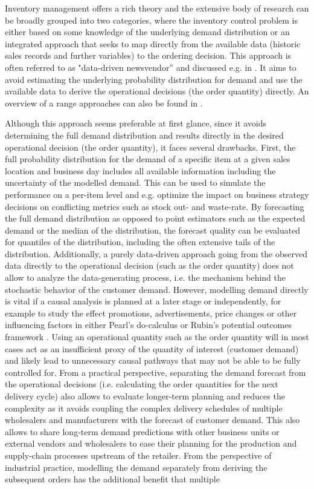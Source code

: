 \documentclass[BCOR=1mm, DIV=calc,10pt,
twoside=true,
twocolumn,
headings=normal]{scrartcl}
\begin{document}
Inventory management offers a rich theory and the extensive body of research can be broadly grouped into two categories, where the inventory control problem is either based on some knowledge of the underlying demand  distribution or an integrated approach that seeks to map directly from the available data (historic sales records and further variables) to the ordering decision. This approach is often referred to as "data-driven newsvendor'' and discussed  e.g. in \cite{beutel2012safety,ban2019big,bertsimas2020predictive, oroojlooyjadid2020applying}. It aims to avoid estimating the underlying probability distribution for demand and use the available data to derive the operational decisions (the order quantity) directly.  An overview of a range approaches can also be found in \cite{huber2019data}.

Although this approach seems preferable at first glance, since it avoids determining the full demand distribution and results directly in the desired operational decision (the order quantity), it faces several drawbacks. First, the full probability distribution for the demand of a specific item at a given sales location and business day includes all available information including the uncertainty of the modelled demand. This can be used to simulate the performance on a per-item level and e.g. optimize the impact on business strategy decisions on conflicting metrics such as stock out- and waste-rate. By forecasting the full demand distribution as opposed to point estimators such as the expected demand or the median of the distribution, the forecast quality can be evaluated for quantiles of the distribution, including the often extensive tails of the distribution. Additionally, a purely data-driven approach going from the observed data directly to the operational decision (such as the order quantity) does not allow to analyze the data-generating process, i.e. the mechanism behind the stochastic behavior of the customer demand. However, modelling demand directly is vital if a causal analysis is planned at a later stage or independently, for example to study the effect promotions, advertisements,  price changes or other influencing factors in either Pearl's do-calculus \cite{PearlCausality} or Rubin's potential outcomes framework \cite{rubin1974estimating}. Using an operational quantity such as the order quantity will in most cases act as an insufficient proxy of the quantity of interest (customer demand) and likely lead to unnecessary causal pathways that may not be able to be fully controlled for. From a practical perspective, separating the demand forecast from the operational decisions (i.e. calculating the  order quantities for the next delivery cycle) also allows to evaluate longer-term planning and reduces the complexity as it avoids coupling the complex delivery schedules of multiple wholesalers and manufacturers with the forecast of customer demand. This also allows to share long-term demand predictions with other business units or external vendors  and wholesalers to ease their planning for the production and supply-chain processes upstream of the retailer. From the perspective of industrial practice, modelling the demand separately from deriving the subsequent orders  has the additional benefit that multiple 
\end{document}
